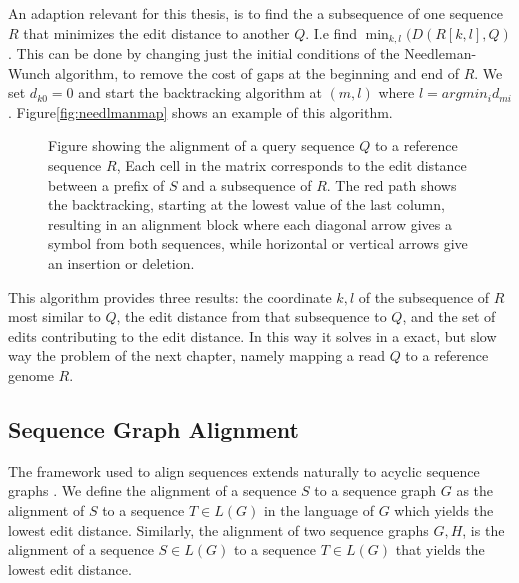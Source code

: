 An adaption relevant for this thesis, is to find the a subsequence of one sequence $R$ that minimizes the edit distance to another $Q$. I.e find $\min_{k, l}(D(R[k, l], Q)$.
This can be done by changing just the initial conditions of the Needleman-Wunch algorithm, to remove the cost of gaps at the beginning and end of $R$. We set $d_{k0} = 0$ and start the backtracking algorithm at $(m, l)$ where $l=arg min_i d_{mi}$. Figure\ref{fig:needlmanmap} shows an example of this algorithm.
\begin{figure}
  \begin{tikzpicture}
    
  \end{tikzpicture}
  \caption{Figure showing the alignment of a query sequence $Q$ to a reference sequence $R$, 
    Each cell in the matrix corresponds to the edit distance between a prefix of $S$ and a subsequence of  $R$. The red path shows the backtracking, starting at the lowest value of the last column, resulting in an alignment block where each diagonal arrow gives a symbol from both sequences, while horizontal or vertical arrows give an insertion or deletion.}
  \label{fig:needlemanmap}
\end{figure}
This algorithm provides three results: the coordinate $k, l$ of the subsequence of $R$ most similar to $Q$, the edit distance from that subsequence to $Q$, and the set of edits contributing to the edit distance. In this way it solves in a exact, but slow way the problem of the next chapter, namely mapping a read $Q$ to a reference genome $R$.

\subsection{Sequence Graph Alignment}
The framework used to align sequences extends naturally to acyclic sequence graphs \cite{hein, poa}. We define the alignment of a sequence $S$ to a sequence graph $G$ as the alignment of $S$ to a sequence $T \in L(G)$ in the language of $G$  which yields the lowest edit distance.
Similarly, the alignment of two sequence graphs $G, H$, is the alignment of a sequence $S \in L(G)$ to a sequence $T \in L(G)$ that yields the lowest edit distance. 


